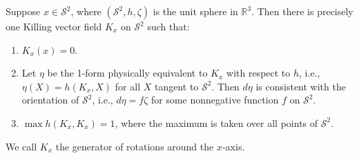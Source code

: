 Suppose $x \in \mathcal{S}^2$, where $(\mathcal{S}^2, h, \zeta)$ is the unit sphere in $\mathbb{R}^3$. Then there is precisely one Killing vector field $K_x$ on $\mathcal{S}^2$ such that:

\begin{enumerate}
\item[(a)] $K_x(x) = 0$.
\item[(b)] Let $\eta$ be the 1-form physically equivalent to $K_x$ with respect to $h$, i.e., $\eta(X) = h(K_x, X)$ for all $X$ tangent to $\mathcal{S}^2$. Then $d\eta$ is consistent with the orientation of $\mathcal{S}^2$, i.e., $d\eta = f\zeta$ for some nonnegative function $f$ on $\mathcal{S}^2$.
\item[(c)] $\max h(K_x, K_x) = 1$, where the maximum is taken over all points of $\mathcal{S}^2$.
\end{enumerate}

We call $K_x$ the generator of rotations around the $x$-axis.
